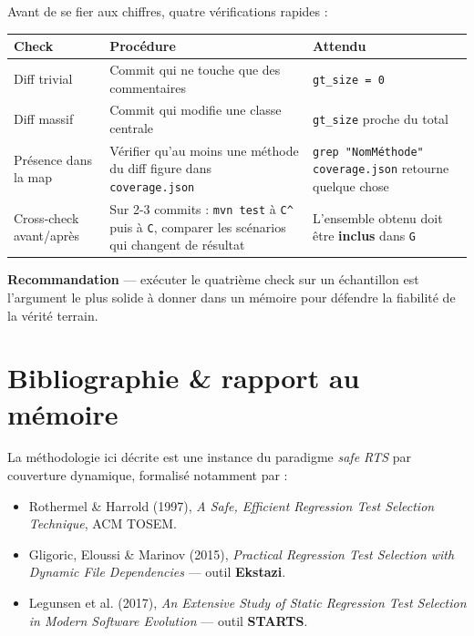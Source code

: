 \documentclass[11pt,a4paper]{article}
\begin{document}
Avant de se fier aux chiffres, quatre vérifications rapides :

\begin{center}
\begin{tabularx}{\textwidth}{|l|X|X|}
\hline
\rowcolor{thbg}
\textbf{Check} & \textbf{Procédure} & \textbf{Attendu} \\
\hline
Diff trivial & Commit qui ne touche que des commentaires & \texttt{gt\_size = 0} \\
\hline
Diff massif & Commit qui modifie une classe centrale & \texttt{gt\_size} proche du total \\
\hline
Présence dans la map & Vérifier qu'au moins une méthode du diff figure dans \texttt{coverage.json} & \texttt{grep "NomMéthode" coverage.json} retourne quelque chose \\
\hline
Cross-check avant/après & Sur 2-3 commits : \texttt{mvn test} à \texttt{C\^{}} puis à \texttt{C}, comparer les scénarios qui changent de résultat & L'ensemble obtenu doit être \textbf{inclus} dans \texttt{G} \\
\hline
\end{tabularx}
\end{center}

\begin{okbox}
\textbf{Recommandation} --- exécuter le quatrième check sur un échantillon est l'argument le plus solide à donner dans un mémoire pour défendre la fiabilité de la vérité terrain.
\end{okbox}


\section{Bibliographie \& rapport au mémoire}
\label{sec:bibliographie}

La méthodologie ici décrite est une instance du paradigme \emph{safe RTS} par couverture dynamique, formalisé notamment par :

\begin{itemize}
  \item Rothermel \& Harrold (1997), \emph{A Safe, Efficient Regression Test Selection Technique}, ACM TOSEM.
  \item Gligoric, Eloussi \& Marinov (2015), \emph{Practical Regression Test Selection with Dynamic File Dependencies} --- outil \textbf{Ekstazi}.
  \item Legunsen et al. (2017), \emph{An Extensive Study of Static Regression Test Selection in Modern Software Evolution} --- outil \textbf{STARTS}.
\end{itemize}
\end{document}
